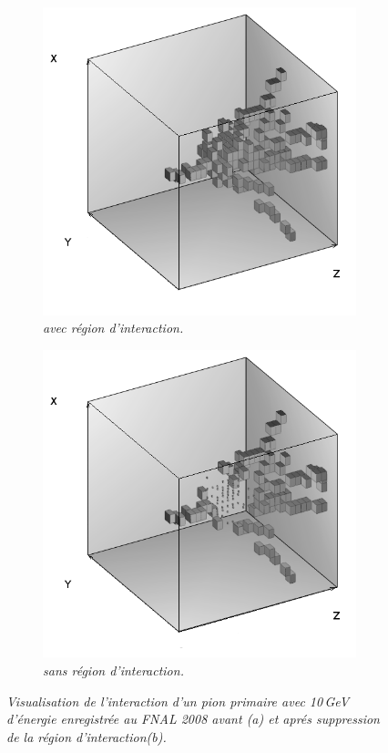 \begin{figure}
	\centering
	\begin{subfigure}{0.5\textwidth}
		\centering
		\includegraphics[width=.90\linewidth]{ECAL/graphics/before.png}
		\caption{\label{fig:beforeF} \sl avec région d'interaction.}
	\end{subfigure}%
	\begin{subfigure}{0.5\textwidth}
		\centering
		\includegraphics[width=.90\linewidth]{ECAL/graphics/after2.png}
		\caption{\label{fig:afterF} \sl sans région d'interaction.}
	\end{subfigure}
	\caption{ \sl Visualisation de l'interaction d'un pion primaire avec 10\,GeV d'\'energie enregistrée au FNAL 2008 avant \textit{(a)} et apr\'es suppression de la région d'interaction\textit{(b)}. }
	\label{fig:testF}
\end{figure}


